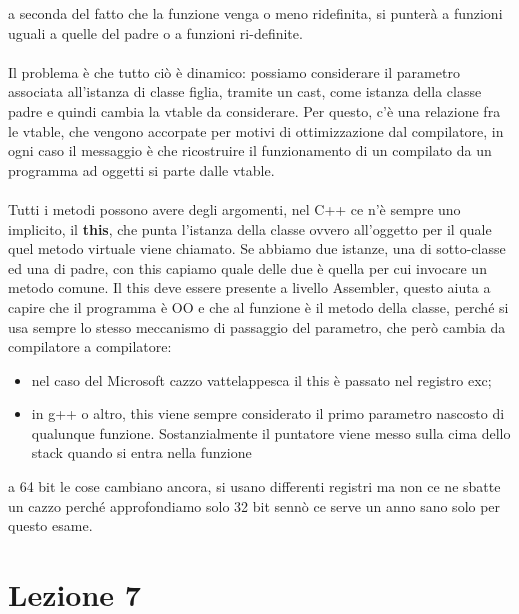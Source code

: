 \documentclass[12pt, oneside]{extbook}
\begin{document}
a seconda del fatto che la funzione venga o meno ridefinita, si punterà a funzioni uguali a quelle del padre o a funzioni ri-definite. \\\\ Il problema è che tutto ciò è dinamico: possiamo considerare il parametro associata all'istanza di classe figlia, tramite un cast, come istanza della classe padre e quindi cambia la vtable da considerare. Per questo, c'è una relazione fra le vtable, che vengono accorpate per motivi di ottimizzazione dal compilatore, in ogni caso il messaggio è che ricostruire il funzionamento di un compilato da un programma ad oggetti si parte dalle vtable.\\\\ Tutti i metodi possono avere degli argomenti, nel C++ ce n'è sempre uno implicito, il \textbf{this}, che punta l'istanza della classe ovvero all'oggetto per il quale quel metodo virtuale viene chiamato. Se abbiamo due istanze, una di sotto-classe ed una di padre, con this capiamo quale delle due è quella per cui invocare un metodo comune. Il this deve essere presente a livello Assembler, questo aiuta a capire che il programma è OO e che al funzione è il metodo della classe, perché si usa sempre lo stesso meccanismo di passaggio del parametro, che però cambia da compilatore a compilatore: 
\begin{itemize}
\item nel caso del Microsoft cazzo vattelappesca il this è passato nel registro exc;
\item in g++ o altro, this viene sempre considerato il primo parametro nascosto di qualunque funzione. Sostanzialmente il puntatore viene messo sulla cima dello stack quando si entra nella funzione
\end{itemize}
a 64 bit le cose cambiano ancora, si usano differenti registri ma non ce ne sbatte un cazzo perché approfondiamo solo 32 bit sennò ce serve un anno sano solo per questo esame.
\chapter{Lezione 7}
\end{document}
